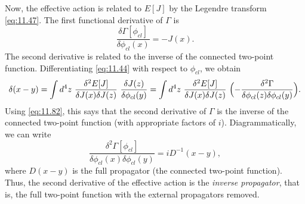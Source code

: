 Now, the effective action is related to $E[J]$ by the Legendre transform
\eqref{eq:11.47}.  The first functional derivative of $\Gamma$ is
\begin{equation}
  \frac{\delta\Gamma[\phi_{cl}]}{\delta\phi_{cl}(x)} = -J(x) .
  \label{eq:11.84}
\end{equation}
The second derivative is related to the inverse of the connected two-point
function.  Differentiating \eqref{eq:11.44} with respect to $\phi_{cl}$, we
obtain
\begin{equation}
  \delta(x-y) = \int d^4z\ \frac{\delta^2 E[J]}{\delta J(x)\delta J(z)}\
    \frac{\delta J(z)}{\delta\phi_{cl}(y)}
  = \int d^4z\ \frac{\delta^2 E[J]}{\delta J(x)\delta J(z)}\
    \Bigl( -\frac{\delta^2\Gamma}{\delta\phi_{cl}(z)\delta\phi_{cl}(y)}
      \Bigr) .
  \label{eq:11.90}
\end{equation}
Using \eqref{eq:11.82}, this says that the second derivative of $\Gamma$ is
the inverse of the connected two-point function (with appropriate factors of
$i$).  Diagrammatically, we can write
\begin{equation}
  \frac{\delta^2\Gamma[\phi_{cl}]}{\delta\phi_{cl}(x)\delta\phi_{cl}(y)}
  = iD^{-1}(x-y) ,
  \label{eq:11.91}
\end{equation}
where $D(x-y)$ is the full propagator (the connected two-point function).
Thus, the second derivative of the effective action is the \emph{inverse
propagator}, that is, the full two-point function with the external
propagators removed.

